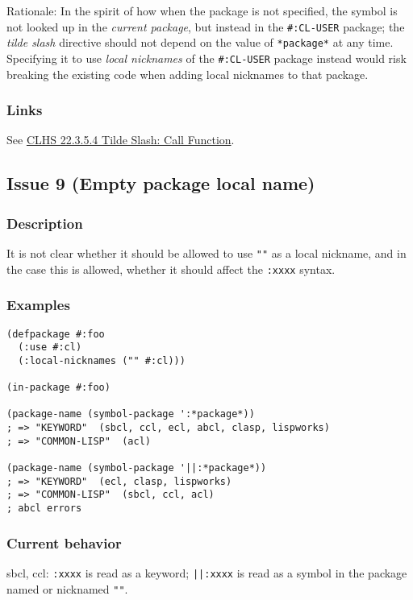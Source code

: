 \documentclass[11pt]{article}
\begin{document}
Rationale: In the spirit of how when the package is not specified, the symbol is
not looked up in the \emph{current package}, but instead in the \texttt{\#:CL-USER} package;
the \emph{tilde slash} directive should not depend on the value of \texttt{*package*} at any
time.  Specifying it to use \emph{local nicknames} of the \texttt{\#:CL-USER} package instead
would risk breaking the existing code when adding local nicknames to that package.
\subsubsection{Links}
\label{sec:org3bba3f2}
See \href{https://www.lispworks.com/documentation/HyperSpec/Body/22\_ced.htm}{CLHS 22.3.5.4 Tilde Slash: Call Function}.

\subsection{Issue 9 (Empty package local name)}
\label{sec:org8f3e03e}
\subsubsection{Description}
\label{sec:orgb6046af}
It is not clear whether it should be allowed to use \texttt{""} as a local nickname,
and in the case this is allowed, whether it should affect the \texttt{:xxxx} syntax.
\subsubsection{Examples}
\label{sec:org3f110da}
\begin{verbatim}
(defpackage #:foo
  (:use #:cl)
  (:local-nicknames ("" #:cl)))

(in-package #:foo)

(package-name (symbol-package ':*package*))
; => "KEYWORD"  (sbcl, ccl, ecl, abcl, clasp, lispworks)
; => "COMMON-LISP"  (acl)

(package-name (symbol-package '||:*package*))
; => "KEYWORD"  (ecl, clasp, lispworks)
; => "COMMON-LISP"  (sbcl, ccl, acl)
; abcl errors
\end{verbatim}
\subsubsection{Current behavior}
\label{sec:org7a26b8d}
sbcl, ccl:
\texttt{:xxxx} is read as a keyword;
\texttt{||:xxxx} is read as a symbol in the package named or nicknamed \texttt{""}.
\end{document}
